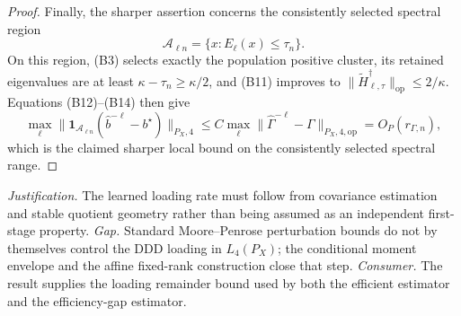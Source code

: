 \documentclass{article}
\begin{document}
\begin{proof}
Finally, the sharper assertion concerns the consistently selected spectral region
\[
 \mathcal A_{\ell n}=\{x:E_\ell(x)\le\tau_n\}.
 \tag{B17}
\]
On this region, (B3) selects exactly the population positive cluster, its retained eigenvalues are at least \(\kappa-\tau_n\ge\kappa/2\), and (B11) improves to \(\|\widetilde H_{\ell,\tau}^\dagger\|_{\mathrm{op}}\le2/\kappa\).  Equations (B12)--(B14) then give
\[
 \max_\ell
 \|\mathbf 1_{\mathcal A_{\ell n}}(\widehat b^{-\ell}-b^\star)\|_{P_X,4}
 \le C\max_\ell\|\widehat\Gamma^{-\ell}-\Gamma\|_{P_X,4,\mathrm{op}}
 =O_P(r_{\Gamma,n}),
 \tag{B18}
\]
which is the claimed sharper local bound on the consistently selected spectral range.
\end{proof}
\par\smallskip\noindent \textit{Justification.} The learned loading rate must follow from covariance estimation and stable quotient geometry rather than being assumed as an independent first-stage property. \textit{Gap.} Standard Moore--Penrose perturbation bounds do not by themselves control the DDD loading in \(L_4(P_X)\); the conditional moment envelope and the affine fixed-rank construction close that step. \textit{Consumer.} The result supplies the loading remainder bound used by both the efficient estimator and the efficiency-gap estimator.
\end{document}
